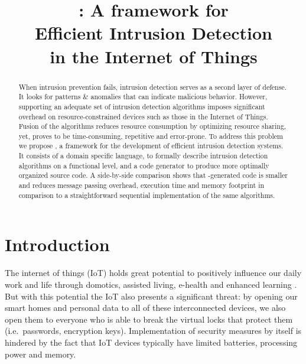 \documentclass[conference]{IEEEtran}
\begin{document}
\title{
\NAME: A framework for \\
Efficient Intrusion Detection\\
in the Internet of Things
}

\author{%
}

\maketitle

\begin{abstract}

When intrusion prevention fails, intrusion detection serves as a second layer
of defense. It looks for patterns \& anomalies that can indicate malicious
behavior. However, supporting an adequate set of intrusion detection algorithms
imposes significant overhead on resource-constrained devices such as those in
the Internet of Things. Fusion of the algorithms reduces resource consumption
by optimizing resource sharing, yet, proves to be time-consuming, repetitive
and error-prone. To address this problem we propose \NAME, a framework for the
development of efficient intrusion detection systems. It consists of a domain
specific language, to formally describe intrusion detection algorithms on a
functional level, and a code generator to produce more optimally organized
source code. A side-by-side comparison shows that \NAME-generated code is
smaller and reduces message passing overhead, execution time and memory
footprint in comparison to a straightforward sequential implementation of the
same algorithms.

\end{abstract}

\section{Introduction}



The internet of things (IoT) holds great potential to positively influence our
daily work and life through domotics, assisted living, e-health and enhanced
learning \cite{atzori2010internet}. But with this potential the IoT also
presents a significant threat: by opening our smart homes and personal data to
all of these interconnected devices, we also open them to everyone who is able
to break the virtual locks that protect them (i.e.\ passwords, encryption
keys). Implementation of security measures by itself is hindered by the fact
that IoT devices typically have limited batteries, processing power and memory.
\end{document}
